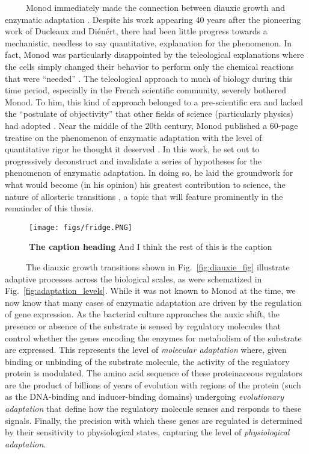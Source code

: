 \documentclass[12pt]{caltech_thesis}
\begin{document}
~~~~~Monod immediately made the connection between diauxic growth and
enzymatic adaptation \autocite{loison2013}. Despite his work appearing
40 years after the pioneering work of Ducleaux and Diénért, there had
been little progress towards a mechanistic, needless to say
quantitative, explanation for the phenomenon. In fact, Monod was
particularly disappointed by the teleological explanations where the
cells simply changed their behavior to perform only the chemical
reactions that were ``needed'' \autocite{loison2013}. The teleological
approach to much of biology during this time period, especially in the
French scientific community, severely bothered Monod. To him, this kind
of approach belonged to a pre-scientific era and lacked the ``postulate
of objectivity'' that other fields of science (particularly physics) had
adopted \autocite{loison2013}. Near the middle of the 20th century,
Monod published a 60-page treatise on the phenomenon of enzymatic
adaptation with the level of quantitative rigor he thought it deserved
\autocite{monod1947}. In this work, he set out to progressively
deconstruct and invalidate a series of hypotheses for the phenomenon of
enzymatic adaptation. In doing so, he laid the groundwork for what would
become (in his opinion) his greatest contribution to science, the nature
of allosteric transitions \autocite{loison2013,monod1963,monod1965}, a
topic that will feature prominently in the remainder of this thesis.

\hypertarget{fig:custom_figure}{%
\begin{figure}
\centering
\texttt{[image: figs/fridge.PNG]}
\caption[{The first short caption.}]{\textbf{The caption heading} And I
think the rest of this is the caption}
\label{fig:custom_figure}
\end{figure}
}

~~~~~The diauxic growth transitions shown in Fig.~\ref{fig:diauxie_fig}
illustrate adaptive processes across the biological scales, as were
schematized in Fig.~\ref{fig:adaptation_levels}. While it was not known
to Monod at the time, we now know that many cases of enzymatic
adaptation are driven by the regulation of gene expression. As the
bacterial culture approaches the auxic shift, the presence or absence of
the substrate is sensed by regulatory molecules that control whether the
genes encoding the enzymes for metabolism of the substrate are
expressed. This represents the level of \emph{molecular adaptation}
where, given binding or unbinding of the substrate molecule, the
activity of the regulatory protein is modulated. The amino acid sequence
of these proteinaceous regulators are the product of billions of years
of evolution with regions of the protein (such as the DNA-binding and
inducer-binding domains) undergoing \emph{evolutionary adaptation} that
define how the regulatory molecule senses and responds to these signals.
Finally, the precision with which these genes are regulated is
determined by their sensitivity to physiological states, capturing the
level of \emph{physiological adaptation}.
\end{document}
